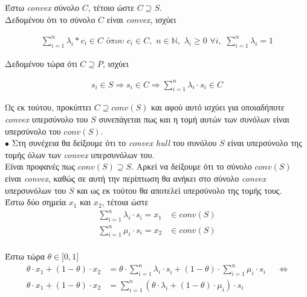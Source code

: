 \documentclass[12pt]{article}
\newcommand{\N}{\mathbb{N}}
\newcommand{\margin}{\hspace{4pt}}
\begin{document}
Έστω \textit{convex} σύνολο $C$, τέτοιο ώστε $C \supseteq S$.\\

Δεδομένου ότι το σύνολο $C$ είναι \textit{convex}, ισχύει

\begin{align*}
    \sum_{i = 1}^{n} λ_i * c_i \in C \text{ όπου }
    c_i \in C, \margin
    n \in \N, \margin
    λ_i \geq 0 \margin \forall i, \margin
    \sum_{i = 1}^{n} λ_i = 1
\end{align*}

Δεδομένου τώρα ότι $C \supseteq P$, ισχύει

\begin{align*}
    s_i \in S \Rightarrow s_i \in C \Rightarrow \sum_{i = 1}^{n} λ_i \cdot s_i \in C
\end{align*}

Ως εκ τούτου, προκύπτει $C \supseteq conv(S)$ και αφού αυτό ισχύει για οποιαδήποτε \textit{convex}
υπερσύνολο του $S$ συνεπάγεται πως και η τομή αυτών των συνόλων είναι υπερσύνολο του $conv(S)$.\\

$\bullet$ Στη συνέχεια θα δείξουμε ότι το \textit{convex hull} του συνόλου $S$ είναι υπερσύνολο της
τομής όλων των \textit{convex} υπερσυνόλων του.\\

Είναι προφανές πως $conv(S) \supseteq S$. Αρκεί να δείξουμε ότι το σύνολο $conv(S)$
είναι \textit{convex}, καθώς σε αυτή την περίπτωση θα ανήκει στο σύνολο \textit{convex} υπερσυνόλων του
$S$ και ως εκ τούτου θα αποτελεί υπερσύνολο της τομής τους.\\

Έστω δύο σημεία $x_1$ και $x_2$, τέτοια ώστε\\

\begin{align*}
    \sum_{i = 1}^{n} λ_i \cdot s_i = x_1 & \in conv(S) \\
    \sum_{i = 1}^{n} μ_i \cdot s_i = x_2 & \in conv(S)
\end{align*}\\

Έστω τώρα $\theta \in \lbrack 0, 1 \rbrack$\\

\begin{align*}
    \theta \cdot x_1 + (1 - \theta) \cdot x_2 & = \theta \cdot \sum_{i = 1}^{n} λ_i \cdot s_i + (1 - \theta) \cdot \sum_{i = 1}^{n} μ_i \cdot s_i && \Leftrightarrow \\
    \theta \cdot x_1 + (1 - \theta) \cdot x_2 & = \sum_{i = 1}^{n}(\theta \cdot λ_i + (1 - \theta) \cdot μ_i) \cdot s_i
\end{align*}\\
\end{document}
